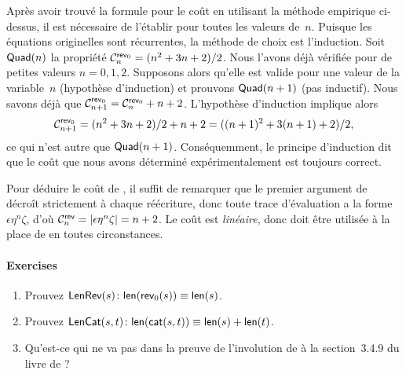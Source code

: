 Après avoir trouvé la formule pour le coût en utilisant la méthode
empirique ci-dessus, il est nécessaire de l'établir pour toutes les
valeurs de~\(n\). Puisque les équations originelles sont récurrentes,
la méthode de choix est l'induction. Soit
\(\pred{Quad}{n}\) la propriété
\(\C{\fun{rev}_0}{n} = (n^2 + 3n + 2)/2\). Nous l'avons déjà vérifiée
pour de petites valeurs \(n = 0, 1, 2\). Supposons alors qu'elle est
valide pour une valeur de la variable~\(n\) (hypothèse d'induction) et
prouvons \(\pred{Quad}{n+1}\) (pas inductif). Nous savons déjà que
\(\C{\fun{rev}_0}{n+1} = \C{\fun{rev}_0}{n} + n +
2\). L'hypothèse d'induction implique
alors
\begin{equation*}
\C{\fun{rev}_0}{n+1} = (n^2 + 3n + 2)/2 + n + 2
                     = ((n+1)^2 + 3(n+1) + 2)/2,
\end{equation*}
ce qui n'est autre que \(\pred{Quad}{n+1}\).
Conséquemment, le principe d'induction dit que le coût que nous avons déterminé expérimentalement est toujours correct.

Pour déduire le coût de , il suffit
de remarquer que le premier argument de
 décroît strictement à chaque
réécriture, donc toute trace d'évaluation a la forme
\(\epsilon\eta^n\zeta\), d'où \(\C{\fun{rev}}{n} =
\len{\epsilon\eta^n\zeta } = n + 2\). Le coût est
\emph{linéaire}, donc
 doit être utilisée à la place de
 en toutes
circonstances.

\paragraph{Exercises}

\begin{enumerate}

  \item Prouvez \(\pred{LenRev}{s} \colon \fun{len}(\fun{rev}_0(s))
    \equiv \fun{len}(s)\).

  \item Prouvez \(\pred{LenCat}{s,t} \colon \fun{len}(\fun{cat}(s,t)) \equiv
  \fun{len}(s) + \fun{len}(t)\).

  \item Qu'est-ce qui ne va pas dans la preuve de l'involution de
   à la section~3.4.9 du livre de
  \cite{CousineauMauny_1998}?

\end{enumerate}

